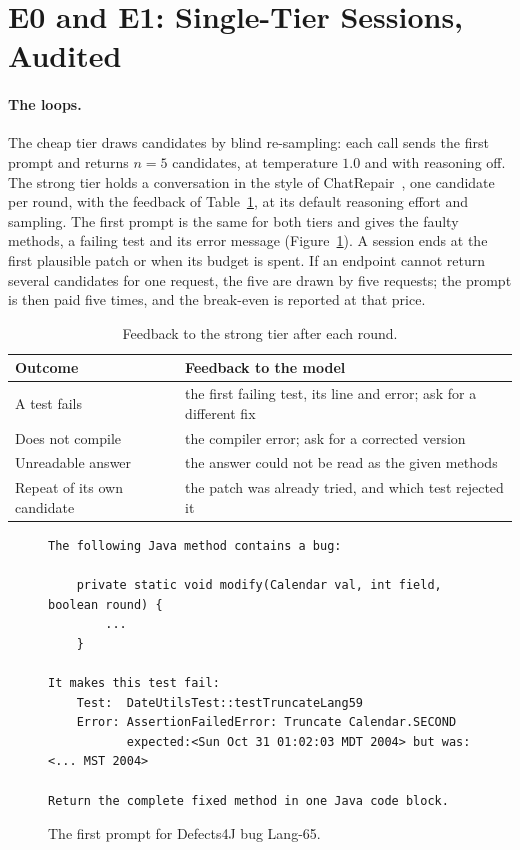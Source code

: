 \section{E0 and E1: Single-Tier Sessions, Audited}
\label{sec:exp-e1}

\paragraph{The loops.} The cheap tier draws candidates by blind re-sampling:
each call sends the first prompt and returns $n = 5$ candidates, at
temperature $1.0$ and with reasoning off. The strong tier holds a conversation
in the style of ChatRepair~\citep{xia2024chatrepair}, one candidate per round,
with the feedback of Table~\ref{tab:exp-prompts}, at its default reasoning
effort and sampling. The
first prompt is the same for both tiers and gives the faulty methods, a
failing test and its error message (Figure~\ref{fig:exp-prompt}). A session
ends at the first plausible patch or when its budget is spent. If an endpoint
cannot return several candidates for one request, the five are drawn by five
requests; the prompt is then paid five times, and the break-even is reported
at that price.

\begin{table}[htbp]
\centering
\caption{Feedback to the strong tier after each round.}
\label{tab:exp-prompts}
\footnotesize
\begin{tabularx}{\textwidth}{@{}>{\raggedright\arraybackslash}p{} >{\raggedright\arraybackslash}X@{}}
\toprule
Outcome & Feedback to the model\\
\midrule
A test fails & the first failing test, its line and error; ask for a different fix\\
Does not compile & the compiler error; ask for a corrected version\\
Unreadable answer & the answer could not be read as the given methods\\
Repeat of its own candidate & the patch was already tried, and which test rejected it\\
\bottomrule
\end{tabularx}
\end{table}

\begin{figure}[htbp]
\centering
\begin{minipage}{0.95\textwidth}
\begin{Verbatim}[frame=single,rulecolor=\color{boxline},fontsize=\footnotesize,framesep=2mm]
The following Java method contains a bug:

    private static void modify(Calendar val, int field, boolean round) {
        ...
    }

It makes this test fail:
    Test:  DateUtilsTest::testTruncateLang59
    Error: AssertionFailedError: Truncate Calendar.SECOND
           expected:<Sun Oct 31 01:02:03 MDT 2004> but was:<... MST 2004>

Return the complete fixed method in one Java code block.
\end{Verbatim}
\end{minipage}
\caption{The first prompt for Defects4J bug Lang-65.}
\label{fig:exp-prompt}
\end{figure}

